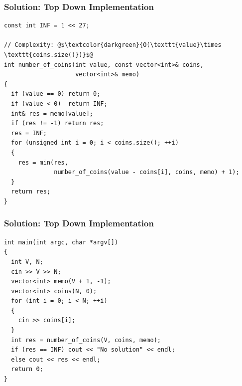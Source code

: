 \documentclass{beamer}
\begin{document}
\begin{frame}[containsverbatim]
\frametitle{Solution: Top Down Implementation}

\scriptsize
\begin{lstlisting}
const int INF = 1 << 27;

// Complexity: @$\textcolor{darkgreen}{O(\texttt{value}\times \texttt{coins.size()})}$@
int number_of_coins(int value, const vector<int>& coins,
                    vector<int>& memo)
{
  if (value == 0) return 0;
  if (value < 0)  return INF;
  int& res = memo[value];
  if (res != -1) return res;
  res = INF;
  for (unsigned int i = 0; i < coins.size(); ++i)
  {
    res = min(res,
              number_of_coins(value - coins[i], coins, memo) + 1);
  }
  return res;
}
\end{lstlisting}

\end{frame}

\begin{frame}[containsverbatim]
\frametitle{Solution: Top Down Implementation}

\scriptsize
\begin{lstlisting}
int main(int argc, char *argv[])
{
  int V, N;
  cin >> V >> N;
  vector<int> memo(V + 1, -1);
  vector<int> coins(N, 0);
  for (int i = 0; i < N; ++i)
  {
    cin >> coins[i];
  }
  int res = number_of_coins(V, coins, memo);
  if (res == INF) cout << "No solution" << endl;
  else cout << res << endl;
  return 0;
}
\end{lstlisting}

\end{frame}

\end{document}
